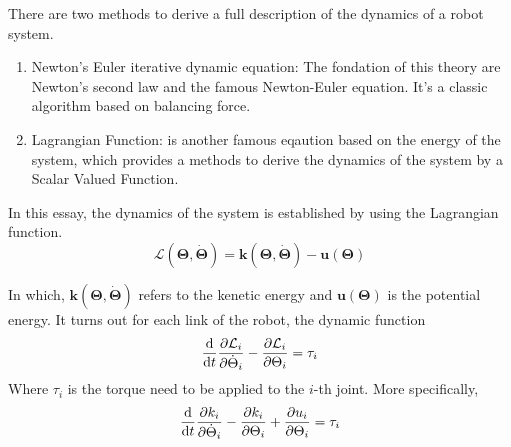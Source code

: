 \documentclass[a4paper]{article}
\begin{document}

There are two methods to derive a full description of the dynamics of a robot system. 

\begin{enumerate}
   \item Newton's Euler iterative dynamic equation: The fondation of this theory are Newton's second law and the famous Newton-Euler equation. It's a classic algorithm based on balancing force. 
   \item Lagrangian Function: is another famous eqaution based on the energy of the system, which provides a methods to derive the dynamics of the system by a Scalar Valued Function. 
\end{enumerate}

In this essay, the dynamics of the system is established by using the Lagrangian function. 
\begin{equation}
   \boldsymbol{\mathcal{L}(\boldsymbol{\Theta},\boldsymbol{\dot\Theta})} = \boldsymbol{k(\Theta,\dot\Theta)}-\boldsymbol{u(\Theta)}
\end{equation}

In which, $\boldsymbol{k(\Theta,\dot\Theta)}$ refers to the kenetic energy and $\boldsymbol{u(\Theta)}$ is the potential energy. It turns out for each link of the robot, the dynamic function\cite{ref3}
\begin{equation}
   \frac{\rm d}{{\rm d}t}\frac{\partial\mathcal{L}_i}{\partial\dot\Theta_i} - \frac{\partial\mathcal{L}_i}{\partial\Theta_i} = \tau_i
\end{equation}
Where $\tau_i$ is the torque need to be applied to the $i$-th joint. More specifically,
\begin{equation}
   \frac{\rm d}{{\rm d}t}\frac{\partial k_i}{\partial\dot\Theta_i} - \frac{\partial k_i}{\partial\Theta_i} + \frac{\partial u_i}{\partial \Theta_i} = \tau_i
   \label{Lagrangian}
\end{equation}
\end{document}
